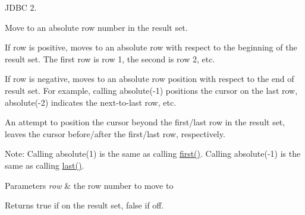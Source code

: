 J\+D\+BC 2.

Move to an absolute row number in the result set. 

If row is positive, moves to an absolute row with respect to the beginning of the result set. The first row is row 1, the second is row 2, etc. 

If row is negative, moves to an absolute row position with respect to the end of result set. For example, calling absolute(-\/1) positions the cursor on the last row, absolute(-\/2) indicates the next-\/to-\/last row, etc. 

An attempt to position the cursor beyond the first/last row in the result set, leaves the cursor before/after the first/last row, respectively. 

Note\+: Calling absolute(1) is the same as calling \mbox{\hyperlink{classcom_1_1mysql_1_1jdbc_1_1_result_set_impl_ad95952bb64306d825909c08271282c6f}{first()}}. Calling absolute(-\/1) is the same as calling \mbox{\hyperlink{classcom_1_1mysql_1_1jdbc_1_1_result_set_impl_ab3e82ce2b3fcc531558c942e42f554c3}{last()}}. 


\begin{DoxyParams}{Parameters}
{\em row} & the row number to move to\\
\hline
\end{DoxyParams}
\begin{DoxyReturn}{Returns}
true if on the result set, false if off.
\end{DoxyReturn}

